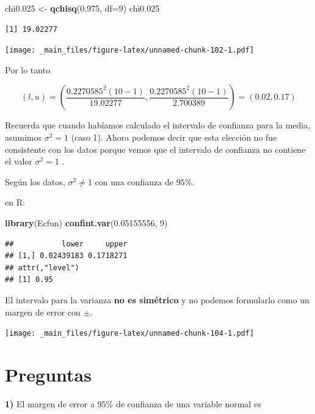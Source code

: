 \documentclass[
]{book}
\newenvironment{Shaded}{\begin{snugshade}}{\end{snugshade}}
\newcommand{\AttributeTok}[1]{\textcolor[rgb]{0.13,0.29,0.53}{#1}}
\newcommand{\DecValTok}[1]{\textcolor[rgb]{0.00,0.00,0.81}{#1}}
\newcommand{\FloatTok}[1]{\textcolor[rgb]{0.00,0.00,0.81}{#1}}
\newcommand{\FunctionTok}[1]{\textcolor[rgb]{0.13,0.29,0.53}{\textbf{#1}}}
\newcommand{\NormalTok}[1]{#1}
\newcommand{\OtherTok}[1]{\textcolor[rgb]{0.56,0.35,0.01}{#1}}
\begin{document}
\begin{Shaded}
\begin{Highlighting}[]
\NormalTok{chi0}\FloatTok{.025} \OtherTok{\textless{}{-}} \FunctionTok{qchisq}\NormalTok{(}\FloatTok{0.975}\NormalTok{, }\AttributeTok{df=}\DecValTok{9}\NormalTok{)}
\NormalTok{chi0}\FloatTok{.025}
\end{Highlighting}
\end{Shaded}

\begin{verbatim}
[1] 19.02277
\end{verbatim}

\texttt{[image: \_main\_files/figure-latex/unnamed-chunk-102-1.pdf]}

Por lo tanto

\[(l,u)= (\frac{0.2270585^2 (10-1)}{19.02277},\frac{0.2270585^2(10-1)}{2.700389})=(0.02,0.17)\]

Recuerda que cuando habíamos calculado el intervalo de confianza para la media, asumimos \(\sigma^2=1\) (caso 1). Ahora podemos decir que esta elección no fue consistente con los datos porque vemos que el intervalo de confianza no contiene el valor \(\sigma^2=1\) .

Según los datos, \(\sigma^2 \neq 1\) con una confianza de \(95\%\).

en R:

\begin{Shaded}
\begin{Highlighting}[]
\FunctionTok{library}\NormalTok{(Ecfun)}
\FunctionTok{confint.var}\NormalTok{(}\FloatTok{0.05155556}\NormalTok{, }\DecValTok{9}\NormalTok{)}
\end{Highlighting}
\end{Shaded}

\begin{verbatim}
##           lower     upper
## [1,] 0.02439183 0.1718271
## attr(,"level")
## [1] 0.95
\end{verbatim}

El intervalo para la varianza \textbf{no es simétrico} y no podemos formularlo como un margen de error con \(\pm\).

\texttt{[image: \_main\_files/figure-latex/unnamed-chunk-104-1.pdf]}

\hypertarget{preguntas-10}{%
\section{Preguntas}\label{preguntas-10}}

\textbf{1)} El margen de error a \(95\%\) de confianza de una variable normal es
\end{document}

